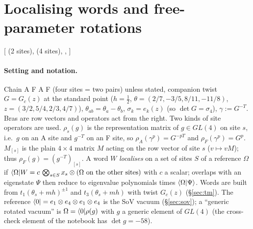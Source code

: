 \section{Localising words and free-parameter rotations}\label{sec:loc}

{\raggedright [ (2 sites),  (4 sites), ,
]\par}

\paragraph{Setting and notation.} Chain A F A F (four sites = two pairs) unless stated, companion twist
$G=G_c(z)$ at the standard point ($h=\tfrac12$, $\theta=(2/7,-3/5,8/11,-11/8)$, $z=(3/2,5/4,2/3,4/7)$),
$\theta_{ab}=\theta_a-\theta_b$, $\sigma_k=e_k(z)$ (so $\det G=\sigma_4$), $\gamma:=G^{-T}$. Bras are row vectors and operators act from the right.
Two kinds of site operators are used. $\rho_s(g)$ is the representation matrix of $g\in GL(4)$ on site $s$, i.e.\ $g$ on an
A site and $g^{-T}$ on an F site, so $\rho_{A}(\gamma^p)=G^{-pT}$ and $\rho_{F}(\gamma^p)=G^{p}$. $M_{[s]}$ is the plain
$4\times4$ matrix $M$ acting on the row vector of site $s$ ($v\mapsto vM$); thus $\rho_F(g)=(g^{-T})_{[s]}$. A word $W$
\emph{localises} on a set of sites $S$ of a reference $\Omega$ if $\langle\Omega| W=c\,\bigotimes_{s\in S}x_s\otimes(\Omega\text{ on the
other sites})$ with $c$ a scalar; overlaps with an eigenstate $\Psi$ then reduce to eigenvalue polynomials times
$\langle\Omega|\Psi\rangle$. Words are built from $t_1(\theta_s+mh)^{\pm1}$ and $t_3(\theta_s+mh)$ with twist $G_c(z)$ (\S\ref{sec:tm}).
The reference $\langle0|=e_1\otimes e_4\otimes e_1\otimes e_4$ is the SoV vacuum (\S\ref{sec:sov}); a ``generic rotated vacuum'' is
$\Omega=\langle0|\rho(g)$ with $g$ a generic element of $GL(4)$ (the cross-check element of the notebook has $\det g=-58$).

